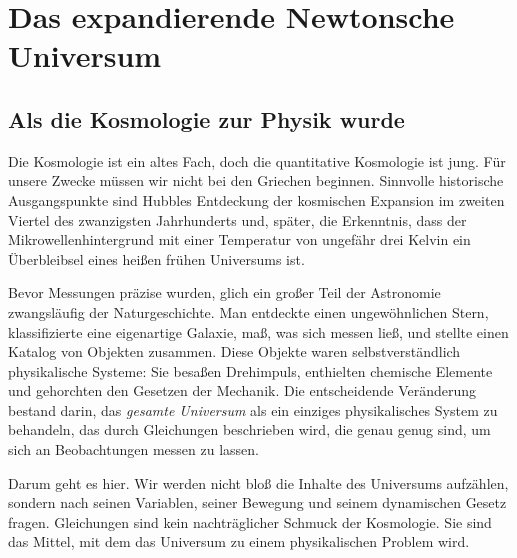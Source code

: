 \chapter{Das expandierende Newtonsche Universum}


\section{Als die Kosmologie zur Physik wurde}

Die Kosmologie ist ein altes Fach, doch die quantitative Kosmologie ist jung. Für unsere Zwecke müssen wir nicht bei den Griechen beginnen. Sinnvolle historische Ausgangspunkte sind Hubbles Entdeckung der kosmischen Expansion im zweiten Viertel des zwanzigsten Jahrhunderts und, später, die Erkenntnis, dass der Mikrowellenhintergrund mit einer Temperatur von ungefähr drei Kelvin ein Überbleibsel eines heißen frühen Universums ist.

Bevor Messungen präzise wurden, glich ein großer Teil der Astronomie zwangsläufig der Naturgeschichte. Man entdeckte einen ungewöhnlichen Stern, klassifizierte eine eigenartige Galaxie, maß, was sich messen ließ, und stellte einen Katalog von Objekten zusammen. Diese Objekte waren selbstverständlich physikalische Systeme: Sie besaßen Drehimpuls, enthielten chemische Elemente und gehorchten den Gesetzen der Mechanik. Die entscheidende Veränderung bestand darin, das \emph{gesamte Universum} als ein einziges physikalisches System zu behandeln, das durch Gleichungen beschrieben wird, die genau genug sind, um sich an Beobachtungen messen zu lassen.

Darum geht es hier. Wir werden nicht bloß die Inhalte des Universums aufzählen, sondern nach seinen Variablen, seiner Bewegung und seinem dynamischen Gesetz fragen. Gleichungen sind kein nachträglicher Schmuck der Kosmologie. Sie sind das Mittel, mit dem das Universum zu einem physikalischen Problem wird.

